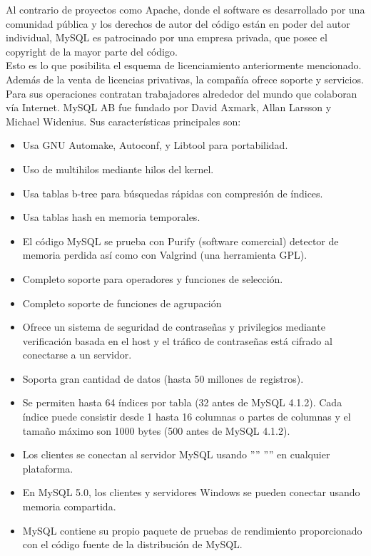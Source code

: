 Al contrario de proyectos como Apache, donde el software es desarrollado por una comunidad pública y los derechos de autor del código están en poder del autor individual, MySQL es patrocinado por una empresa privada, que posee el copyright de la mayor parte del código.\\
Esto es lo que posibilita el esquema de licenciamiento anteriormente mencionado. Además de la venta de licencias privativas, la compañía ofrece soporte y servicios. Para sus operaciones contratan trabajadores alrededor del mundo que colaboran vía Internet. MySQL AB fue fundado por David Axmark, Allan Larsson y Michael Widenius. Sus características principales son:

\begin{itemize}
\item Usa GNU Automake, Autoconf, y Libtool para portabilidad.
\item Uso de multihilos mediante hilos del kernel.
\item Usa tablas b-tree para búsquedas rápidas con compresión de índices.
\item Usa tablas hash en memoria temporales.
\item El código MySQL se prueba con Purify (software comercial) detector de memoria perdida así como con Valgrind (una herramienta GPL).
\item Completo soporte para operadores y funciones de selección.
\item Completo soporte de funciones de agrupación
\item Ofrece un sistema de seguridad de contraseñas y privilegios mediante verificación basada en el host y el tráfico de contraseñas está cifrado al conectarse a un servidor.
\item Soporta gran cantidad de datos (hasta 50 millones de registros).
\item Se permiten hasta 64 índices por tabla (32 antes de MySQL 4.1.2). Cada índice puede consistir desde 1 hasta 16 columnas o partes de columnas y el tamaño máximo son 1000 bytes (500 antes de MySQL 4.1.2).
\item Los clientes se conectan al servidor MySQL usando '''' '''' en cualquier plataforma.
\item En MySQL 5.0, los clientes y servidores Windows se pueden conectar usando memoria compartida.
\item MySQL contiene su propio paquete de pruebas de rendimiento proporcionado con el código fuente de la distribución de MySQL.
\end{itemize}

